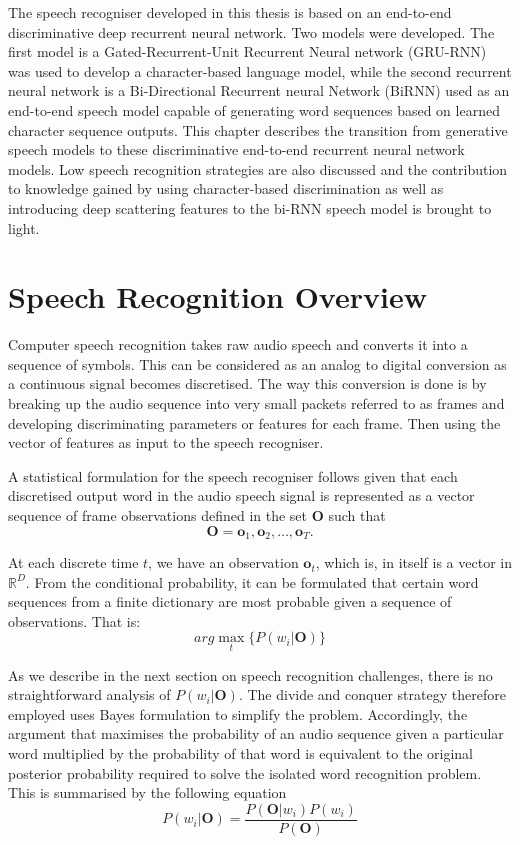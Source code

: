 The speech recogniser developed in this thesis is based on an end-to-end discriminative deep recurrent neural network.  Two models were developed.  The first model is a Gated-Recurrent-Unit Recurrent Neural network (GRU-RNN) was used to develop a character-based language model, while the second recurrent neural network is a Bi-Directional Recurrent neural Network (BiRNN) used as an end-to-end speech model capable of generating word sequences based on learned character sequence outputs.  This chapter describes the transition from generative speech models to these discriminative end-to-end recurrent neural network models.  Low speech recognition strategies are also discussed and the contribution to knowledge gained by using character-based discrimination as well as introducing deep scattering features to the bi-RNN speech model is brought to light.

\section{Speech Recognition Overview}\label{Ch_2_SROverview}
Computer speech recognition takes raw audio speech and converts it into a sequence of symbols.  This can be considered as an analog to digital conversion as a continuous signal becomes discretised.  The way this conversion is done is by breaking up the audio sequence into very small packets referred to as frames and developing discriminating parameters or features for each frame. Then using the vector of features as input to the speech recogniser.  

A statistical formulation \citep{young2002htk} for the speech recogniser follows given that each discretised output word in the audio speech signal is represented as a vector sequence of frame observations defined in the set $\mathbf{O}$ such that 
\begin{equation}\mathbf{O}=\mathbf{o}_1,\mathbf{o}_2,\dots,\mathbf{o}_T.
\label{eqn_1_1_sr_inputs}
\end{equation}

At each discrete time $t$, we have an observation $\mathbf{o}_t$, which is, in itself is a vector in $\mathbb{R}^D$.  From the conditional probability, it can be formulated that certain word sequences from a finite dictionary are most probable given a sequence of observations. That is:
\begin{equation}arg\max_t\{P(w_i|\mathbf{O})\}
\label{eqn_2_2_srgen}
\end{equation}

As we describe in the next section on speech recognition challenges, there is no straightforward analysis of $P(w_i|\mathbf{O})$.  The divide and conquer strategy therefore employed uses Bayes formulation to simplify the problem.  Accordingly, the argument that maximises the probability of an audio sequence given a particular word multiplied by the probability of that word is equivalent to the original posterior probability required to solve the isolated word recognition problem. This is summarised by the following equation
\begin{equation}P(w_i|\mathbf{O})=\frac{P(\mathbf{O}|w_i)P(w_i)}{P(\mathbf{O})}
\label{eqn_2_3_bayes_sr}
\end{equation}

